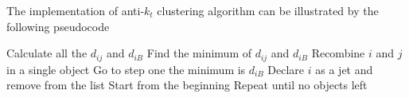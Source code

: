 %
%
%
%
%


The implementation of anti-$k_t$ clustering algorithm can be illustrated by the following pseudocode
\begin{algorithmic}
\State Calculate all the $d_{ij}$ and $d_{iB}$
\State Find the minimum of $d_{ij}$ and $d_{iB}$ 
	\State Recombine $i$ and $j$ in a single object 
	\State Go to step one
\Else \State the minimum is $d_{iB}$
	\State Declare $i$ as a jet and remove from the list
	\State Start from the beginning	
\EndIf
\State Repeat until no objects left 
\end{algorithmic}

